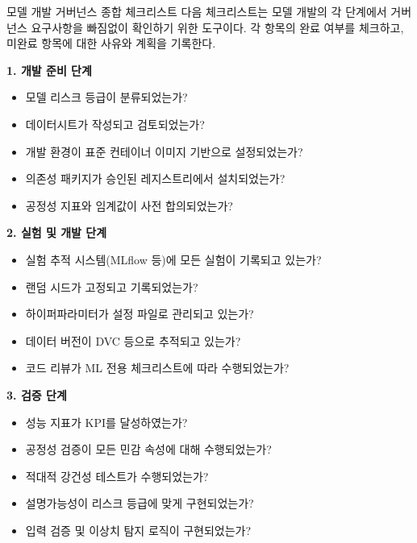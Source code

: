 \begin{practicaltool}{모델 개발 거버넌스 종합 체크리스트}
다음 체크리스트는 모델 개발의 각 단계에서 거버넌스 요구사항을 빠짐없이 확인하기 위한 도구이다. 각 항목의 완료 여부를 체크하고, 미완료 항목에 대한 사유와 계획을 기록한다.

\begin{tcolorbox}[colback=white, colframe=black!75!white, title=모델 개발 거버넌스 체크리스트]

\textbf{1. 개발 준비 단계}
\begin{itemize}
  \item[$\square$] 모델 리스크 등급이 분류되었는가?
  \item[$\square$] 데이터시트가 작성되고 검토되었는가?\cite{gebru2021datasheets}
  \item[$\square$] 개발 환경이 표준 컨테이너 이미지 기반으로 설정되었는가?
  \item[$\square$] 의존성 패키지가 승인된 레지스트리에서 설치되었는가?
  \item[$\square$] 공정성 지표와 임계값이 사전 합의되었는가?
\end{itemize}

\textbf{2. 실험 및 개발 단계}
\begin{itemize}
  \item[$\square$] 실험 추적 시스템(MLflow 등)에 모든 실험이 기록되고 있는가?
  \item[$\square$] 랜덤 시드가 고정되고 기록되었는가?
  \item[$\square$] 하이퍼파라미터가 설정 파일로 관리되고 있는가?
  \item[$\square$] 데이터 버전이 DVC 등으로 추적되고 있는가?
  \item[$\square$] 코드 리뷰가 ML 전용 체크리스트에 따라 수행되었는가?
\end{itemize}

\textbf{3. 검증 단계}
\begin{itemize}
  \item[$\square$] 성능 지표가 KPI를 달성하였는가?
  \item[$\square$] 공정성 검증이 모든 민감 속성에 대해 수행되었는가?
  \item[$\square$] 적대적 강건성 테스트가 수행되었는가?\cite{goodfellow2014explaining}
  \item[$\square$] 설명가능성이 리스크 등급에 맞게 구현되었는가?\cite{arrieta2020explainable}
  \item[$\square$] 입력 검증 및 이상치 탐지 로직이 구현되었는가?
\end{itemize}


\end{tcolorbox}
\end{practicaltool}
